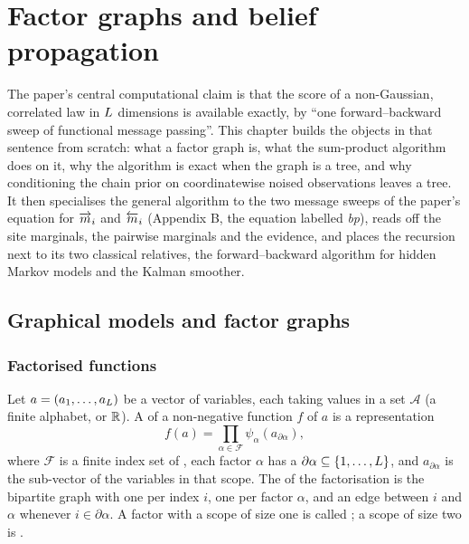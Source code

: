 \chapter{Factor graphs and belief propagation}
\label{ch:factor-graphs-bp}

The paper's central computational claim is that the score of a non-Gaussian,
correlated law in $L$ dimensions is available exactly, by ``one forward--backward
sweep of functional message passing''. This chapter builds the objects in that sentence
from scratch: what a factor graph is, what the sum-product algorithm does on it, why the
algorithm is exact when the graph is a tree, and why conditioning the chain prior on
coordinatewise noised observations leaves a tree. It then specialises the general
algorithm to the two message sweeps of the paper's equation for $\overrightarrow{m}_i$ and $\overleftarrow{m}_i$
(Appendix B, the equation labelled \emph{bp}), reads off the site marginals, the pairwise
marginals and the evidence, and places the recursion next to its two classical
relatives, the forward--backward algorithm for hidden Markov models and the Kalman
smoother.

\section{Graphical models and factor graphs}

\subsection{Factorised functions}

Let $a=(a_1,\dots,a_L)$ be a vector of variables, each taking values in a set
$\mathcal{A}$ (a finite alphabet, or $\mathbb{R}$). A  of a
non-negative function $f$ of $a$ is a representation
\begin{equation}
  f(a)=\prod_{\alpha\in\mathcal{F}}\psi_\alpha(a_{\partial\alpha}),
  \label{eq:bp-factorisation}
\end{equation}
where $\mathcal{F}$ is a finite index set of , each factor $\alpha$ has a
 $\partial\alpha\subseteq\{1,\dots,L\}$, and $a_{\partial\alpha}$ is the
sub-vector of the variables in that scope. The  of the factorisation
is the bipartite graph with one  per index $i$, one  per factor $\alpha$, and an edge between $i$ and $\alpha$ whenever
$i\in\partial\alpha$. A factor with a scope of size one is called
; a scope of size two is .

